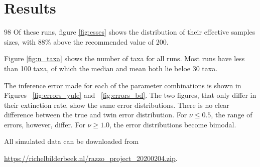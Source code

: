 \section{Results}

98%
Of these runs, figure \ref{fig:esses} shows the distribution 
of their effective samples sizes, with 88\% above the recommended 
value of 200. 

Figure \ref{fig:n_taxa} shows the number of taxa for all runs. 
Most runs have less than 100 taxa, of which the median and mean both lie
beloe 30 taxa.

The inference error made for each of the parameter combinations
is shown in Figures ~\ref{fig:errors_yule} and ~\ref{fig:errors_bd}.
The two figures, that only differ in their extinction rate, 
show the same error distributions. There is no clear difference between
the true and twin error distribution. For $\nu \leqslant 0.5$, the
range of errors, however, differ. For $\nu \geq 1.0$, the error
distributions become bimodal. 

All simulated data can be downloaded from 
\begin{sloppypar}
\url{https://richelbilderbeek.nl/razzo_project_20200204.zip}.
\end{sloppypar}

